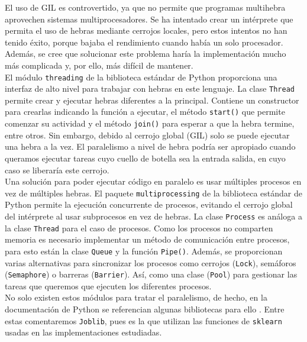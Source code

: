 \documentclass[12pt,a4paper]{report} %
\theoremstyle{definition}
\begin{document}
El uso de GIL es controvertido, ya que no permite que programas multihebra aprovechen sistemas multiprocesadores. Se ha intentado crear un intérprete que permita el uso de hebras mediante cerrojos locales, pero estos intentos no han tenido éxito, porque bajaba el rendimiento cuando había un solo procesador. Además, se cree que solucionar este problema haría la implementación mucho más complicada y, por ello, más difícil de mantener.\\

% 
El módulo \texttt{threading} \cite{threading} de la biblioteca estándar de Python proporciona una interfaz de alto nivel para trabajar con hebras en este lenguaje. La clase \texttt{Thread} permite crear y ejecutar hebras diferentes a la principal. Contiene un constructor para crearlas indicando la función a ejecutar, el método \texttt{start()} que permite comenzar su actividad y el método \texttt{join()} para esperar a que la hebra termine, entre otros. Sin embargo, debido al cerrojo global (GIL) solo se puede ejecutar una hebra a la vez. El paralelismo a nivel de hebra podría ser apropiado cuando queramos ejecutar tareas cuyo cuello de botella sea la entrada salida, en cuyo caso se liberaría este cerrojo. \\


Una solución para poder ejecutar código en paralelo es usar múltiples procesos en vez de múltiples hebras. El paquete \texttt{multiprocessing} \cite{multiprocessing} de la biblioteca estándar de Python permite la ejecución concurrente de procesos, evitando el cerrojo global del intérprete al usar subprocesos en vez de hebras. La clase \texttt{Process} es análoga a la clase \texttt{Thread} para el caso de procesos. Como los procesos no comparten memoria es necesario implementar un método de comunicación entre procesos, para esto están la clase \texttt{Queue} y la función \texttt{Pipe()}. Además, se proporcionan varias alternativas para sincronizar los procesos como cerrojos (\texttt{Lock}), semáforos (\texttt{Semaphore}) o barreras (\texttt{Barrier}). Así, como una clase (\texttt{Pool}) para gestionar las tareas que queremos que ejecuten los diferentes procesos.\\

No solo existen estos módulos para tratar el paralelismo, de hecho, en la documentación de Python se referencian algunas bibliotecas para ello \cite{parallelprocessing}. Entre estas comentaremos \texttt{Joblib}, pues es la que utilizan las funciones de \texttt{sklearn} usadas en las implementaciones estudiadas.\\
\end{document}
